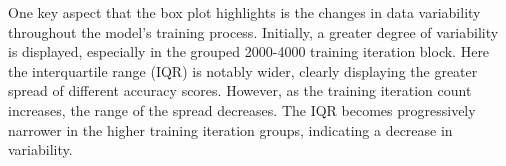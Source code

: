One key aspect that the box plot highlights is the changes in data variability throughout the model's training process. Initially, a greater degree of variability is displayed, especially in the grouped 2000-4000 training iteration block. Here the interquartile range (IQR) is notably wider, clearly displaying the greater spread of different accuracy scores.  However, as the training iteration count increases, the range of the spread decreases. The IQR becomes progressively narrower in the higher training iteration groups, indicating a decrease in variability. \\ 


